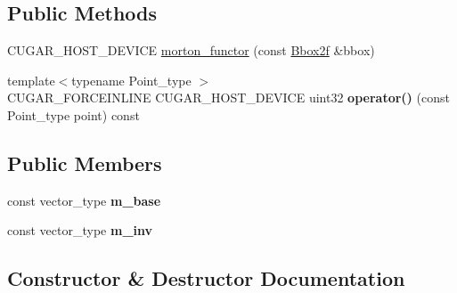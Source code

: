 \subsection*{Public Methods}
\begin{DoxyCompactItemize}
\item 
C\+U\+G\+A\+R\+\_\+\+H\+O\+S\+T\+\_\+\+D\+E\+V\+I\+CE \hyperlink{structcugar_1_1morton__functor_3_01uint32_00_012u_00_01_bbox_type_01_4_a22f7d67d7676d39c3cf6b58b27115c6e}{morton\+\_\+functor} (const \hyperlink{structcugar_1_1_bbox}{Bbox2f} \&bbox)
\item 
\mbox{\label{structcugar_1_1morton__functor_3_01uint32_00_012u_00_01_bbox_type_01_4_adddd67e8bcb38ffbc1369e93350612df}} 
{\footnotesize template$<$typename Point\+\_\+type $>$ }\\C\+U\+G\+A\+R\+\_\+\+F\+O\+R\+C\+E\+I\+N\+L\+I\+NE C\+U\+G\+A\+R\+\_\+\+H\+O\+S\+T\+\_\+\+D\+E\+V\+I\+CE uint32 {\bfseries operator()} (const Point\+\_\+type point) const
\end{DoxyCompactItemize}
\subsection*{Public Members}
\begin{DoxyCompactItemize}
\item 
\mbox{\label{structcugar_1_1morton__functor_3_01uint32_00_012u_00_01_bbox_type_01_4_a39c01ec883cd0686fd9fe4749095671b}} 
const vector\+\_\+type {\bfseries m\+\_\+base}
\item 
\mbox{\label{structcugar_1_1morton__functor_3_01uint32_00_012u_00_01_bbox_type_01_4_aacec74ca715221f55a44ab0ddba3579d}} 
const vector\+\_\+type {\bfseries m\+\_\+inv}
\end{DoxyCompactItemize}


\subsection{Constructor \& Destructor Documentation}
\mbox{\label{structcugar_1_1morton__functor_3_01uint32_00_012u_00_01_bbox_type_01_4_a22f7d67d7676d39c3cf6b58b27115c6e}} 
